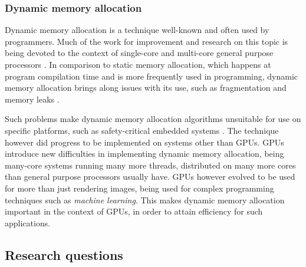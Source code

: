 \documentclass[12pt,twoside]{article}
\begin{document}
\subsubsection*{Dynamic memory allocation}

Dynamic memory allocation is a technique well-known and often used by programmers. Much of the work for improvement and research on this topic is being devoted to the context of single-core and multi-core general purpose processors \cite{YOU2015}. In comparison to static memory allocation, which happens at program compilation time and is more frequently used in programming, dynamic memory allocation brings along issues with its use, such as fragmentation and memory leaks \cite{TRAISTER199099}.

Such problems make dynamic memory allocation algorithms unsuitable for use on specific platforms, such as safety-critical embedded systems \cite{Puaut_2002}. The technique however did progress to be implemented on systems other than GPUs. GPUs introduce new difficulties in implementing dynamic memory allocation, being many-core systems running many more threads, distributed on many more cores than general purpose processors usually have. GPUs however evolved to be used for more than just rendering images, being used for complex programming techniques such as \textit{machine learning}. This makes dynamic memory allocation important in the context of GPUs, in order to attain efficiency for such applications.



\subsection{Research questions}
\label{sec:questions}
\end{document}
